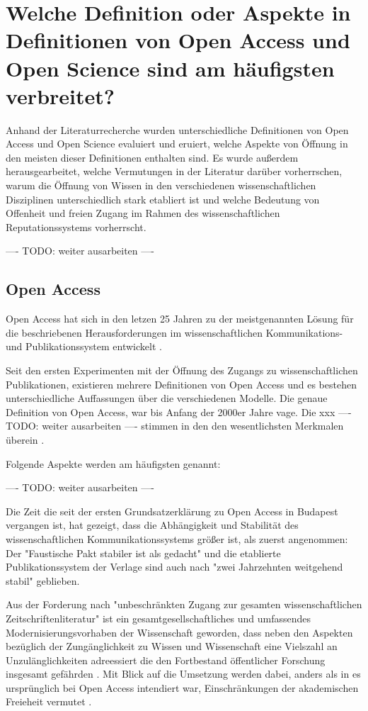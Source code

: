\section{Welche Definition oder Aspekte in Definitionen von Open Access und Open Science sind am häufigsten verbreitet?}

Anhand der Literaturrecherche wurden unterschiedliche Definitionen von Open Access und Open Science evaluiert und eruiert, welche Aspekte von Öffnung in den meisten dieser Definitionen enthalten sind. Es wurde außerdem herausgearbeitet, welche Vermutungen in der Literatur darüber vorherrschen, warum die Öffnung von Wissen in den verschiedenen wissenschaftlichen Disziplinen unterschiedlich stark etabliert ist und welche Bedeutung von Offenheit und freien Zugang im Rahmen des wissenschaftlichen Reputationssystems vorherrscht.

---- TODO: weiter ausarbeiten ----

\subsection{Open Access}

Open Access hat sich in den letzen 25 Jahren zu der meistgenannten Lösung für die beschriebenen Herausforderungen im wissenschaftlichen Kommunikations- und Publikationssystem entwickelt \cite{brembs2015open}.

Seit den ersten Experimenten mit der Öffnung des Zugangs zu wissenschaftlichen Publikationen,  existieren mehrere Definitionen von Open Access und es bestehen unterschiedliche Auffassungen über die verschiedenen Modelle. Die genaue Definition von Open Access, war bis Anfang der 2000er Jahre vage. Die xxx ---- TODO: weiter ausarbeiten ---- stimmen in den den wesentlichsten Merkmalen überein \cite{albert_2006_open_implications}.

Folgende Aspekte werden am häufigsten genannt:

---- TODO: weiter ausarbeiten ----

Die Zeit die seit der ersten Grundsatzerklärung zu Open Access in Budapest vergangen ist, hat gezeigt, dass die Abhängigkeit und Stabilität des wissenschaftlichen Kommunikationssystems größer ist, als zuerst angenommen: Der "Faustische Pakt stabiler ist als gedacht" \cite{hagner_2015_sache_buches} und die etablierte Publikationssystem der Verlage sind auch nach "zwei Jahrzehnten weitgehend stabil" \cite{Hanekop_2014} geblieben.

Aus der Forderung nach "unbeschränkten Zugang zur gesamten wissenschaftlichen Zeitschriftenliteratur" \cite{boai_2012} ist ein gesamtgesellschaftliches und umfassendes Modernisierungsvorhaben der Wissenschaft geworden, dass neben den Aspekten bezüglich der Zungänglichkeit zu Wissen und Wissenschaft eine Vielszahl an Unzulänglichkeiten adreessiert die den Fortbestand öffentlicher Forschung insgesamt gefährden \cite{brembs2015open}. Mit Blick auf die Umsetzung werden dabei, anders als in es ursprünglich bei Open Access intendiert war, Einschränkungen der akademischen Freieheit vermutet \cite{hagner_2015_sache_buches}.

